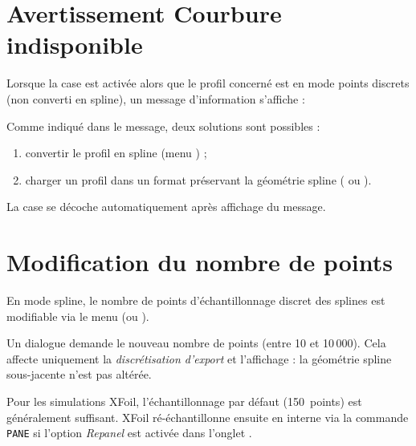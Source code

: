 \section{Avertissement \og Courbure indisponible \fg{}}

Lorsque la case  est activée alors que le profil
concerné est en mode points discrets (non converti en spline),
un message d'information s'affiche :


Comme indiqué dans le message, deux solutions sont possibles :

\begin{enumerate}
    \item convertir le profil en spline (menu
        ) ;
    \item charger un profil dans un format préservant la
        géométrie spline ( ou ).
\end{enumerate}

La case se décoche automatiquement après affichage du message.

\section{Modification du nombre de points}

En mode spline, le nombre de points d'échantillonnage discret
des splines est modifiable via le menu  (ou
).

Un dialogue demande le nouveau nombre de points (entre 10 et
10\,000). Cela affecte uniquement la \emph{discrétisation
d'export} et l'affichage : la géométrie spline sous-jacente
n'est pas altérée.

\begin{noteinfo}
Pour les simulations XFoil, l'échantillonnage par défaut
(150~points) est généralement suffisant. XFoil ré-échantillonne
ensuite en interne via la commande \texttt{PANE} si l'option
\emph{Repanel} est activée dans l'onglet .
\end{noteinfo}

